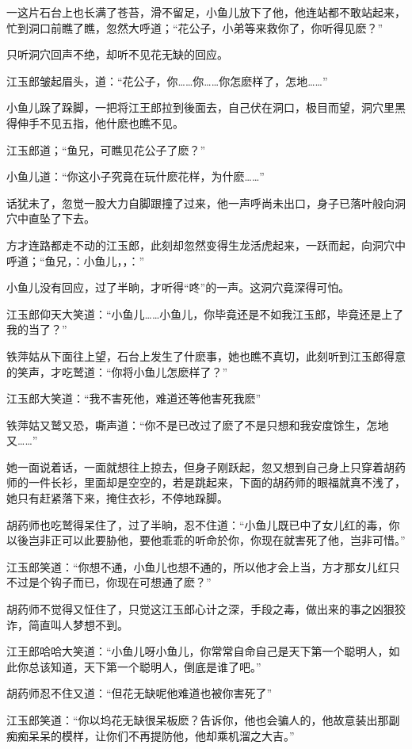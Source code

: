 \documentclass[12pt,oneside]{book}
\begin{document}
一这片石台上也长满了苍苔，滑不留足，小鱼儿放下了他，他连站都不敢站起来，忙到洞口前瞧了瞧，忽然大呼道；``花公子，小弟等来救你了，你听得见麽？''

只听洞穴回声不绝，却听不见花无缺的回应。

江玉郎皱起眉头，道：``花公子，你\ldots\ldots 你\ldots\ldots 你怎麽样了，怎地\ldots\ldots{}''

小鱼儿跺了跺脚，一把将江王郎拉到後面去，自己伏在洞口，极目而望，洞穴里黑得伸手不见五指，他什麽也瞧不见。

江玉郎道；``鱼兄，可瞧见花公子了麽？''

小鱼儿道：``你这小子究竟在玩什麽花样，为什麽\ldots\ldots{}''

话犹未了，忽觉一股大力自脚跟撞了过来，他一声呼尚未出口，身子已落叶般向洞穴中直坠了下去。

方才连路都走不动的江玉郎，此刻却忽然变得生龙活虎起来，一跃而起，向洞穴中呼道；``鱼兄，：小鱼儿，，：''

小鱼儿没有回应，过了半晌，才听得``咚''的一声。这洞穴竟深得可怕。

江玉郎仰天大笑道：``小鱼儿\ldots\ldots 小鱼儿，你毕竟还是不如我江玉郎，毕竟还是上了我的当了？''

铁萍姑从下面往上望，石台上发生了什麽事，她也瞧不真切，此刻听到江玉郎得意的笑声，才吃鹫道：``你将小鱼儿怎麽样了？''

江玉郎大笑道：``我不害死他，难道还等他害死我麽''

铁萍姑又鹫又恐，嘶声道：``你不是已改过了麽了不是只想和我安度馀生，怎地又\ldots\ldots{}''

她一面说着话，一面就想往上掠去，但身子刚跃起，忽又想到自己身上只穿着胡药师的一件长衫，里面却是空空的，若是跳起来，下面的胡药师的眼福就真不浅了，她只有赶紧落下来，掩住衣衫，不停地跺脚。

胡药师也吃鹫得呆住了，过了半晌，忍不住道：``小鱼儿既已中了女儿红的毒，你以後岂非正可以此要胁他，要他乖乖的听命於你，你现在就害死了他，岂非可惜。''

江玉郎笑道：``你想不通，小鱼儿也想不通的，所以他才会上当，方才那女儿红只不过是个钩子而已，你现在可想通了麽？''

胡药师不觉得又怔住了，只觉这江玉郎心计之深，手段之毒，做出来的事之凶狠狡诈，简直叫人梦想不到。

江王郎哈哈大笑道：``小鱼儿呀小鱼儿，你常常自命自己是天下第一个聪明人，如此你总该知道，天下第一个聪明人，倒底是谁了吧。''

胡药师忍不住又道：``但花无缺呢他难道也被你害死了''

江玉郎笑道：``你以坞花无缺很呆板麽？告诉你，他也会骗人的，他故意装出那副痴痴呆呆的模样，让你们不再提防他，他却乘机溜之大吉。''
\end{document}
